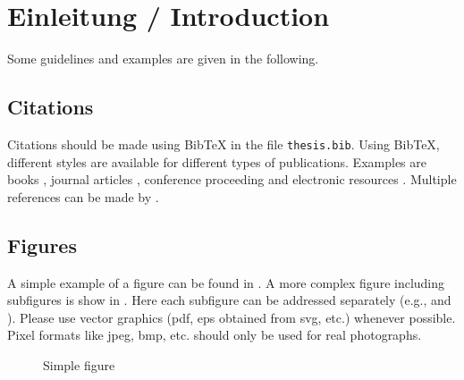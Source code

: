\documentclass[pdftex, a4paper, oneside, parskip, numbers=noenddot, listof=totoc, bibliography=totocnumbered, hyperfootnotes=false]{scrreprt}
\begin{document}




%

\tableofcontents
\listoffigures
\listoftables
\lstlistoflistings

\pagebreak
{}

\chapter{Einleitung / Introduction}

Some guidelines and examples are given in the following.

\section{Citations}

Citations should be made using BibTeX in the file \verb|thesis.bib|. 
Using BibTeX, different styles are available for different types of publications. Examples are books \cite{Adams90}, journal articles \cite{Zhang99}, conference proceeding \cite{Yee99} and 
electronic resources \cite{Fear05}. Multiple references can be made by \cite{Adams90,Zhang99,Yee99,Fear05}.


\section{Figures}

A simple example of a figure can be found in . A more complex figure including subfigures is show in . Here each subfigure can be addressed separately (e.g.,  and ). Please use vector graphics (pdf, eps obtained from svg, etc.) whenever possible. Pixel formats like jpeg, bmp, etc. should only be used for real photographs.

\begin{figure}[!h]
	\centering
  \fbox{\parbox{5cm}{\centering ~\vspace{1.5cm}\\Dummy\\~\vspace{1.5cm}}} %
  \caption{Simple figure}
  \label{fig:simple_figure}
\end{figure}
\end{document}
